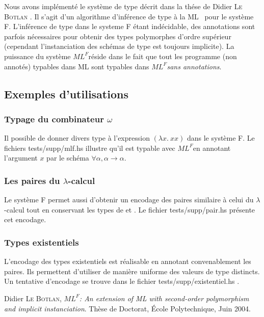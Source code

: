 \documentclass[a4paper]{article}
\def\mlf{$ML^F$}
\begin{document}
Nous avons implémenté le système de type décrit dans la thése de
Didier \textsc{Le Botlan} \cite{lebotlan}. Il s'agit
d'un algorithme d'inférence de type \og à la ML \fg~pour le système F.
L'inférence de type dans le systeme F étant indécidable, des
annotations sont parfois nécessaires pour obtenir des types polymorphes
d'ordre supérieur (cependant l'instanciation des schémas de type est
toujours implicite). La puissance du système \mlf réside dans le fait
que tout les programme (non annotés) typables dans ML sont typables
dans \mlf \emph{sans annotations}.

\subsection{Exemples d'utilisations}

\subsubsection{Typage du combinateur $\omega$}
Il possible de donner divers type à l'expression $(\lambda x.\ x x)$
dans le système F. Le fichiers \og tests/supp/mlf.hs \fg{} illustre
qu'il est typable avec \mlf en annotant l'argument $x$ par le schéma
$\forall \alpha, \alpha \rightarrow \alpha$.


\subsubsection{Les paires du $\lambda$-calcul}
Le système F permet aussi d'obtenir un encodage des paires similaire à
celui du $\lambda$-calcul tout en conservant les types de 
et . Le fichier \og tests/supp/pair.hs \fg{} présente cet
encodage.

\subsubsection{Types existentiels}
L'encodage des types existentiels est réalisable en annotant
convenablement les paires. Ils permettent d'utiliser de manière
uniforme des valeurs de type distincts. Un tentative d'encodage se
trouve dans le fichier \og tests/supp/existentiel.hs \fg.

\begin{thebibliography}{1}

  Didier \textsc{Le Botlan},
  \emph{\mlf : An extension of ML with second-order polymorphism and
    implicit instanciation}.
  Thèse de Doctorat,
  École Polytechnique,
  Juin 2004.

\end{thebibliography}
\end{document}
